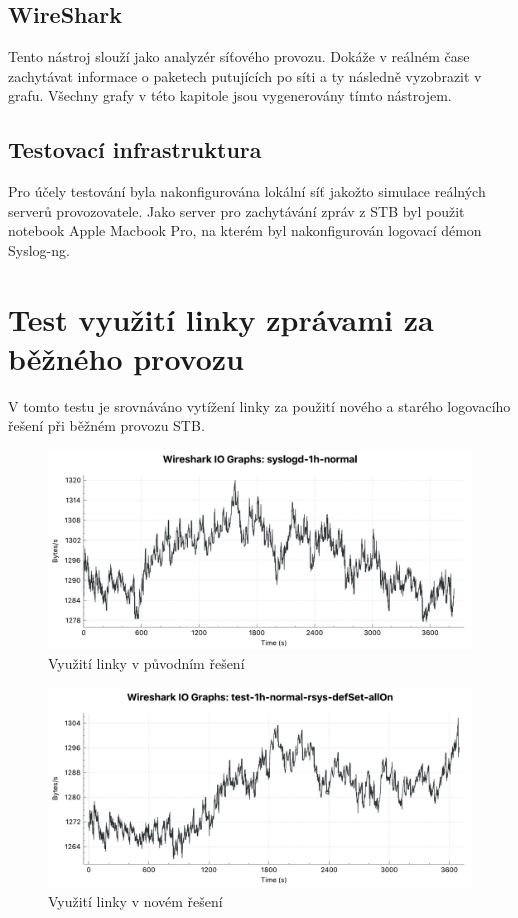 \documentclass[thesis=B,czech]{FITthesis}[2012/06/26]
\begin{document}
\subsection{WireShark}
Tento nástroj slouží jako analyzér síťového provozu. Dokáže v reálném čase zachytávat informace o paketech putujících po síti a ty následně vyzobrazit v grafu. Všechny grafy v této kapitole jsou vygenerovány tímto nástrojem.

\subsection{Testovací infrastruktura}
Pro účely testování byla nakonfigurována lokální síť jakožto simulace reálných serverů provozovatele. Jako server pro zachytávání zpráv z STB byl použit notebook Apple Macbook Pro, na kterém byl nakonfigurován logovací démon Syslog-ng.

\section{Test využití linky zprávami za běžného provozu}
 V tomto testu je srovnáváno vytížení linky za použití nového a starého logovacího řešení při běžném provozu STB. 

\begin{figure}[H]
	\centering
	\includegraphics[scale=0.44]{images/test-1h-syslogd-default}
	\caption[Využití linky v původním řešení]{Využití linky v původním řešení}
\end{figure}

\begin{figure}[H]
	\centering
	\includegraphics[scale=0.44]{images/test-1h-rsys-default}
	\caption[Využití linky v novém řešení]{Využití linky v novém řešení}
\end{figure}
\end{document}
